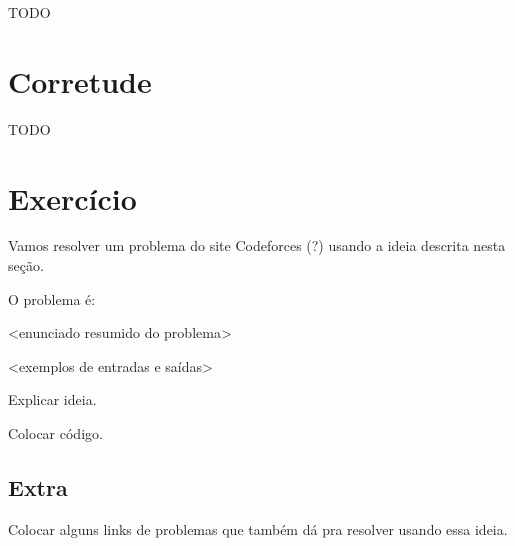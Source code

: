 TODO

\section{Corretude}

TODO

\section{Exercício}

Vamos resolver um problema do site Codeforces (?) usando a ideia descrita nesta seção.

O problema é:

<enunciado resumido do problema>

<exemplos de entradas e saídas>

Explicar ideia.

Colocar código.


\subsection{Extra}

Colocar alguns links de problemas que também dá pra resolver usando essa ideia.
